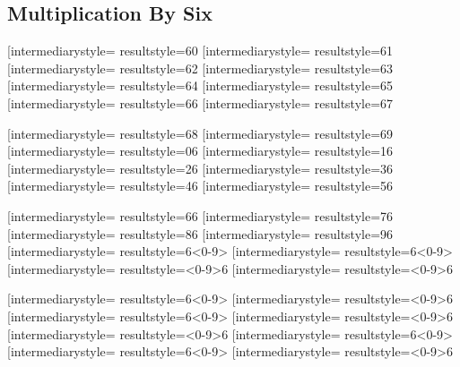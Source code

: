 \documentclass[letterpaper, 17pt]{article}
\newcommand{\white}[1]{}
\begin{document}
\begin{center}
	\section*{Multiplication By Six}

	\opmul[intermediarystyle=\white, resultstyle=\white]{6}{0}\qquad
	\opmul[intermediarystyle=\white, resultstyle=\white]{6}{1}\qquad
	\opmul[intermediarystyle=\white, resultstyle=\white]{6}{2}\qquad
	\opmul[intermediarystyle=\white, resultstyle=\white]{6}{3}\qquad
	\opmul[intermediarystyle=\white, resultstyle=\white]{6}{4}\qquad
	\opmul[intermediarystyle=\white, resultstyle=\white]{6}{5}\qquad
	\opmul[intermediarystyle=\white, resultstyle=\white]{6}{6}\qquad
	\opmul[intermediarystyle=\white, resultstyle=\white]{6}{7}\qquad

	\vspace{0.3in}

	\opmul[intermediarystyle=\white, resultstyle=\white]{6}{8}\qquad
	\opmul[intermediarystyle=\white, resultstyle=\white]{6}{9}\qquad
	\opmul[intermediarystyle=\white, resultstyle=\white]{0}{6}\qquad
	\opmul[intermediarystyle=\white, resultstyle=\white]{1}{6}\qquad
	\opmul[intermediarystyle=\white, resultstyle=\white]{2}{6}\qquad
	\opmul[intermediarystyle=\white, resultstyle=\white]{3}{6}\qquad
	\opmul[intermediarystyle=\white, resultstyle=\white]{4}{6}\qquad
	\opmul[intermediarystyle=\white, resultstyle=\white]{5}{6}\qquad

	\vspace{0.3in}

	\opmul[intermediarystyle=\white, resultstyle=\white]{6}{6}\qquad
	\opmul[intermediarystyle=\white, resultstyle=\white]{7}{6}\qquad
	\opmul[intermediarystyle=\white, resultstyle=\white]{8}{6}\qquad
	\opmul[intermediarystyle=\white, resultstyle=\white]{9}{6}\qquad
	\opmul[intermediarystyle=\white, resultstyle=\white]{6}{<0-9>}\qquad
	\opmul[intermediarystyle=\white, resultstyle=\white]{6}{<0-9>}\qquad
	\opmul[intermediarystyle=\white, resultstyle=\white]{<0-9>}{6}\qquad
	\opmul[intermediarystyle=\white, resultstyle=\white]{<0-9>}{6}\qquad

	\vspace{0.3in}

	\opmul[intermediarystyle=\white, resultstyle=\white]{6}{<0-9>}\qquad
	\opmul[intermediarystyle=\white, resultstyle=\white]{<0-9>}{6}\qquad
	\opmul[intermediarystyle=\white, resultstyle=\white]{6}{<0-9>}\qquad
	\opmul[intermediarystyle=\white, resultstyle=\white]{<0-9>}{6}\qquad
	\opmul[intermediarystyle=\white, resultstyle=\white]{<0-9>}{6}\qquad
	\opmul[intermediarystyle=\white, resultstyle=\white]{6}{<0-9>}\qquad
	\opmul[intermediarystyle=\white, resultstyle=\white]{6}{<0-9>}\qquad
	\opmul[intermediarystyle=\white, resultstyle=\white]{<0-9>}{6}\qquad


\end{center}
\end{document}

